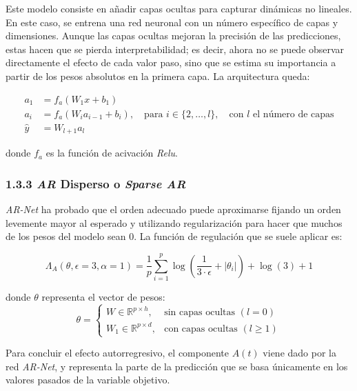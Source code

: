 \documentclass[12pt,twoside]{article}
\begin{document}
Este modelo consiste en añadir capas ocultas para capturar dinámicas no lineales. En este caso, se entrena una red neuronal con un número específico de capas y dimensiones. Aunque las capas ocultas mejoran la precisión de las predicciones, estas hacen que se pierda interpretabilidad; es decir, ahora no se puede observar directamente el efecto de cada valor paso, sino que se estima su importancia a partir de los pesos absolutos en la primera capa. La arquitectura queda:

\begin{equation}
\begin{aligned}
a_1 &= f_a(W_1 x + b_1) \\
a_i &= f_a(W_i a_{i-1} + b_i), \quad \text{para } i \in \{2, \dots, l\} ,  \quad \text{con $l$ el número de capas}\\
\hat{y} &= W_{l+1} a_l
\end{aligned}
\end{equation}

donde $f_a$ es la función de acivación \textit{Relu}.


\subsubsection*{1.3.3 \textit{AR} Disperso o \textit{Sparse AR}}\label{sec:27}

\textit{AR-Net} ha probado que el orden adecuado puede aproximarse fijando un orden levemente mayor al esperado y utilizando regularización para hacer que muchos de los pesos del modelo sean 0. La función de regulación que se suele aplicar es:

\begin{equation}
\Lambda_A(\theta, \epsilon = 3, \alpha = 1) = \frac{1}{p}\sum_{i=1}^{p} \log\left(\frac{1}{3 \cdot \epsilon} + |\theta_i|\right) + \log(3) + 1
\end{equation}

donde $\theta$ representa el vector de pesos:
\begin{equation}
\theta =
\begin{cases}
W \in \mathbb{R}^{p \times h}, & \text{sin capas ocultas } (l = 0) \\
W_1 \in \mathbb{R}^{p \times d}, & \text{con capas ocultas } (l \geq 1)
\end{cases}
\end{equation}

Para concluir el efecto autorregresivo, el componente $A(t)$ viene dado por la red \textit{AR-Net}, y representa la parte de la predicción que se basa únicamente en los valores pasados de la variable objetivo.
\end{document}
